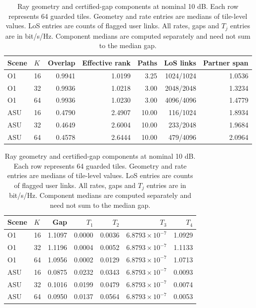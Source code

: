 \documentclass[10pt,letterpaper]{article}
\begin{document}
\begin{table}[htbp]
\centering
\caption{Ray geometry and certified-gap components at nominal 10 dB. Each row represents 64 guarded tiles. Geometry and rate entries are medians of tile-level values. LoS entries are counts of flagged user links. All rates, gaps and \(T_j\) entries are in bit/s/Hz. Component medians are computed separately and need not sum to the median gap.}
\label{supp:table6}
\small
\begin{tabular}{llrrrrr}
\hline
Scene & \(K\) & Overlap & Effective rank & Paths & LoS links & Partner span\\
\hline
O1 &16&0.9941&1.0199&3.25&1024/1024&1.0536\\
O1 &32&0.9936&1.0218&3.00&2048/2048&1.3234\\
O1 &64&0.9936&1.0230&3.00&4096/4096&1.4779\\
ASU &16&0.4790&2.4907&10.00&116/1024&1.8934\\
ASU &32&0.4649&2.6004&10.00&233/2048&1.9684\\
ASU &64&0.4578&2.6444&10.00&479/4096&2.0964\\
\hline
\end{tabular}

\medskip
\begin{tabular}{llrrrrr}
\hline
Scene & \(K\) & Gap & \(T_1\) & \(T_2\) & \(T_3\) & \(T_4\)\\
\hline
O1 &16&1.1097&0.0000&0.0036&\(6.8793\times10^{-7}\)&1.0929\\
O1 &32&1.1196&0.0004&0.0052&\(6.8793\times10^{-7}\)&1.1133\\
O1 &64&1.0956&0.0002&0.0129&\(6.8793\times10^{-7}\)&1.0713\\
ASU &16&0.0875&0.0232&0.0343&\(6.8793\times10^{-7}\)&0.0093\\
ASU &32&0.1016&0.0199&0.0479&\(6.8793\times10^{-7}\)&0.0074\\
ASU &64&0.0950&0.0137&0.0564&\(6.8793\times10^{-7}\)&0.0053\\
\hline
\end{tabular}
\end{table}
\end{document}
